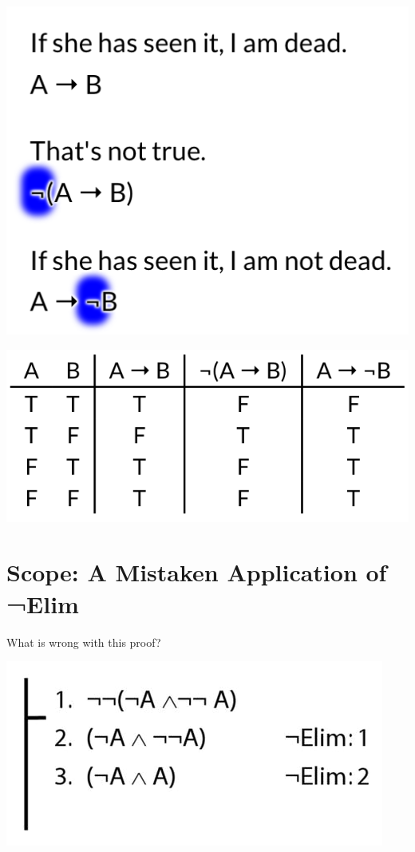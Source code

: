 \documentclass[12pt]{extarticle}
\begin{document}
\begin{multicols*}{3}
\begin{center}
\includegraphics[scale=0.3]{img/not_if.png}
\end{center}
\begin{center}
\includegraphics[scale=0.3]{img/not_if_tt.png}
\end{center}
 
 
\section{Scope: A Mistaken Application of ¬Elim}
 
What is wrong with this proof?
 
\begin{center}
\includegraphics[scale=0.3]{img/proof_negation_elim_wrong.png}
\end{center}
 

\end{multicols*}
\end{document}
